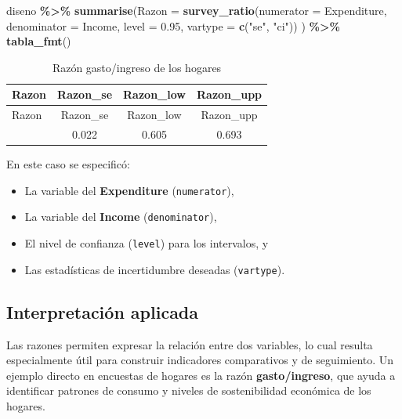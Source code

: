 \documentclass[
  spanish,
  12pt,
]{book}
\newenvironment{Shaded}{\begin{snugshade}}{\end{snugshade}}
\newcommand{\AttributeTok}[1]{\textcolor[rgb]{0.13,0.29,0.53}{#1}}
\newcommand{\FloatTok}[1]{\textcolor[rgb]{0.00,0.00,0.81}{#1}}
\newcommand{\FunctionTok}[1]{\textcolor[rgb]{0.13,0.29,0.53}{\textbf{#1}}}
\newcommand{\NormalTok}[1]{#1}
\newcommand{\SpecialCharTok}[1]{\textcolor[rgb]{0.81,0.36,0.00}{\textbf{#1}}}
\newcommand{\StringTok}[1]{\textcolor[rgb]{0.31,0.60,0.02}{#1}}
\providecommand{\tightlist}{%
  \setlength{\itemsep}{0pt}\setlength{\parskip}{0pt}}
\begin{document}
\begin{Shaded}
\begin{Highlighting}[]
\NormalTok{diseno }\SpecialCharTok{\%\textgreater{}\%} 
  \FunctionTok{summarise}\NormalTok{(}\AttributeTok{Razon =} \FunctionTok{survey\_ratio}\NormalTok{(}\AttributeTok{numerator =}\NormalTok{ Expenditure,}
                                 \AttributeTok{denominator =}\NormalTok{ Income,}
                                 \AttributeTok{level =} \FloatTok{0.95}\NormalTok{,}
                                 \AttributeTok{vartype =}  \FunctionTok{c}\NormalTok{(}\StringTok{"se"}\NormalTok{, }\StringTok{"ci"}\NormalTok{))}
\NormalTok{            ) }\SpecialCharTok{\%\textgreater{}\%}
  \FunctionTok{tabla\_fmt}\NormalTok{()}
\end{Highlighting}
\end{Shaded}

\begin{longtable}[]{@{}lccc@{}}
\caption{\label{tab:tab-razon-gasto-ingreso}Razón gasto/ingreso de los hogares}\tabularnewline
\toprule\noalign{}
Razon & Razon\_se & Razon\_low & Razon\_upp \\
\midrule\noalign{}
\endfirsthead
\toprule\noalign{}
Razon & Razon\_se & Razon\_low & Razon\_upp \\
\midrule\noalign{}
\endhead
\bottomrule\noalign{}
\endlastfoot
0.649 & 0.022 & 0.605 & 0.693 \\
\end{longtable}

En este caso se especificó:

\begin{itemize}
\tightlist
\item
  La variable del \textbf{Expenditure} (\texttt{numerator}),
\item
  La variable del \textbf{Income} (\texttt{denominator}),
\item
  El nivel de confianza (\texttt{level}) para los intervalos, y
\item
  Las estadísticas de incertidumbre deseadas (\texttt{vartype}).
\end{itemize}

\subsection*{Interpretación aplicada}\label{interpretaciuxf3n-aplicada}

Las razones permiten expresar la relación entre dos variables, lo cual resulta especialmente útil para construir indicadores comparativos y de seguimiento. Un ejemplo directo en encuestas de hogares es la razón \textbf{gasto/ingreso}, que ayuda a identificar patrones de consumo y niveles de sostenibilidad económica de los hogares.
\end{document}

